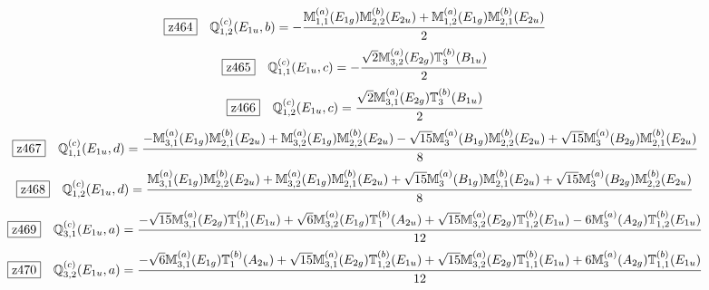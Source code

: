 \documentclass[fleqn,10pt,landscape]{jsarticle}
\begin{document}
\begin{dmath*}
\hspace*{3mm}\fbox{z464}\quad \mathbb{Q}_{1,2}^{(c)}(E_{1u},b)=- \frac{\mathbb{M}_{1,1}^{(a)}(E_{1g}) \mathbb{M}_{2,2}^{(b)}(E_{2u}) + \mathbb{M}_{1,2}^{(a)}(E_{1g}) \mathbb{M}_{2,1}^{(b)}(E_{2u})}{2}
\end{dmath*}
\begin{dmath*}
\hspace*{3mm}\fbox{z465}\quad \mathbb{Q}_{1,1}^{(c)}(E_{1u},c)=- \frac{\sqrt{2} \mathbb{M}_{3,2}^{(a)}(E_{2g}) \mathbb{T}_{3}^{(b)}(B_{1u})}{2}
\end{dmath*}
\begin{dmath*}
\hspace*{3mm}\fbox{z466}\quad \mathbb{Q}_{1,2}^{(c)}(E_{1u},c)=\frac{\sqrt{2} \mathbb{M}_{3,1}^{(a)}(E_{2g}) \mathbb{T}_{3}^{(b)}(B_{1u})}{2}
\end{dmath*}
\begin{dmath*}
\hspace*{3mm}\fbox{z467}\quad \mathbb{Q}_{1,1}^{(c)}(E_{1u},d)=\frac{- \mathbb{M}_{3,1}^{(a)}(E_{1g}) \mathbb{M}_{2,1}^{(b)}(E_{2u}) + \mathbb{M}_{3,2}^{(a)}(E_{1g}) \mathbb{M}_{2,2}^{(b)}(E_{2u}) - \sqrt{15} \mathbb{M}_{3}^{(a)}(B_{1g}) \mathbb{M}_{2,2}^{(b)}(E_{2u}) + \sqrt{15} \mathbb{M}_{3}^{(a)}(B_{2g}) \mathbb{M}_{2,1}^{(b)}(E_{2u})}{8}
\end{dmath*}
\begin{dmath*}
\hspace*{3mm}\fbox{z468}\quad \mathbb{Q}_{1,2}^{(c)}(E_{1u},d)=\frac{\mathbb{M}_{3,1}^{(a)}(E_{1g}) \mathbb{M}_{2,2}^{(b)}(E_{2u}) + \mathbb{M}_{3,2}^{(a)}(E_{1g}) \mathbb{M}_{2,1}^{(b)}(E_{2u}) + \sqrt{15} \mathbb{M}_{3}^{(a)}(B_{1g}) \mathbb{M}_{2,1}^{(b)}(E_{2u}) + \sqrt{15} \mathbb{M}_{3}^{(a)}(B_{2g}) \mathbb{M}_{2,2}^{(b)}(E_{2u})}{8}
\end{dmath*}
\begin{dmath*}
\hspace*{3mm}\fbox{z469}\quad \mathbb{Q}_{3,1}^{(c)}(E_{1u},a)=\frac{- \sqrt{15} \mathbb{M}_{3,1}^{(a)}(E_{2g}) \mathbb{T}_{1,1}^{(b)}(E_{1u}) + \sqrt{6} \mathbb{M}_{3,2}^{(a)}(E_{1g}) \mathbb{T}_{1}^{(b)}(A_{2u}) + \sqrt{15} \mathbb{M}_{3,2}^{(a)}(E_{2g}) \mathbb{T}_{1,2}^{(b)}(E_{1u}) - 6 \mathbb{M}_{3}^{(a)}(A_{2g}) \mathbb{T}_{1,2}^{(b)}(E_{1u})}{12}
\end{dmath*}
\begin{dmath*}
\hspace*{3mm}\fbox{z470}\quad \mathbb{Q}_{3,2}^{(c)}(E_{1u},a)=\frac{- \sqrt{6} \mathbb{M}_{3,1}^{(a)}(E_{1g}) \mathbb{T}_{1}^{(b)}(A_{2u}) + \sqrt{15} \mathbb{M}_{3,1}^{(a)}(E_{2g}) \mathbb{T}_{1,2}^{(b)}(E_{1u}) + \sqrt{15} \mathbb{M}_{3,2}^{(a)}(E_{2g}) \mathbb{T}_{1,1}^{(b)}(E_{1u}) + 6 \mathbb{M}_{3}^{(a)}(A_{2g}) \mathbb{T}_{1,1}^{(b)}(E_{1u})}{12}
\end{dmath*}
\end{document}
